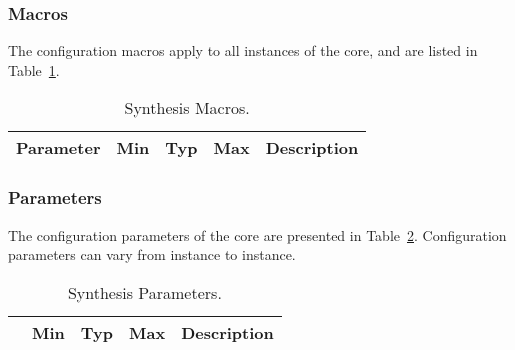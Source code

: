 \ifdefined\SM

\subsubsection{Macros}

The configuration macros apply to all instances of the core, and are listed in
Table~\ref{tab:sm}.

\begin{table}[h]
  \centering
    \begin{tabularx}{\textwidth}{ | c | c | c | c | X | }
    \hline
    \rowcolor{iob-green}
    {\bf Parameter} & {\bf Min} & {\bf Typ} & {\bf Max} & {\bf Description} \\\hline

    

    \end{tabularx}
  \caption{Synthesis Macros.}
  \label{tab:sm}
\end{table}

\noindent

\fi

\ifdefined\SP

\subsubsection{Parameters}
\label{sec:cp}

The configuration parameters of the core are presented in
Table~\ref{tab:sp}. Configuration parameters can vary from instance to instance.

\begin{table}[h]
  \centering
    \begin{tabular}{|l|c|c|c|p{9cm}|}
    \hline
    \rowcolor{iob-green}
    \multicolumn{1}{|c}{\bf Parameter} & \multicolumn{1}{|c|}{\bf Min} & \multicolumn{1}{c|}{\bf Typ} & \multicolumn{1}{c|}{\bf Max} & \multicolumn{1}{c|}{\bf Description}  \\ \hline \hline

    

    \end{tabular}
    
\caption{Synthesis Parameters.}
  \label{tab:sp}
\end{table}

\fi
